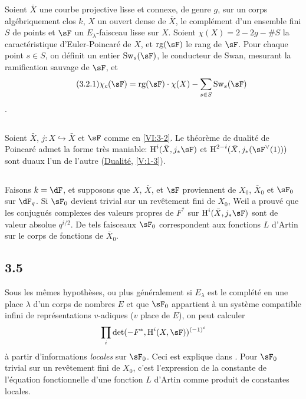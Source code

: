 Soient $\bar X$ une courbe projective lisse et connexe, de genre $g$, sur un 
corps algébriquement clos $k$, $X$ un ouvert dense de $\bar X$, 
le complément d'un ensemble fini $S$ de points et $\sF$ un 
$E_\lambda$-faisceau lisse sur $X$. Soient $\chi(X)=2-2 g-\# S$ la 
caractéristique d'Euler-Poincaré de $X$, et $\operatorname{rg}(\sF)$ le 
rang de $\sF$. Pour chaque point $s\in S$, on définit un entier 
$\swan_s(\sF)$, le conducteur de Swan, mesurant la ramification sauvage de 
$\sF$, et 
\begin{align*}\tag{3.2.1}\label{VI:eq:3-2-1}
  \chi_c(\sF) = \operatorname{rg}(\sF) \cdot \chi(X) - \sum_{s\in S} \swan_s(\sF) 
\end{align*}
\cite{ra65}. 





\subsection{}\label{VI:3-3}

Soient $\bar X$, $j:X\hookrightarrow\bar X$ et $\sF$ comme en \ref{VI:3-2}. Le 
théorème de dualité de Poincaré admet la forme très maniable: 
$\h^i(\bar X,j_\ast \sF)$ et $\h^{2-i}(\bar X,j_\ast(\sF^\vee(1)))$ sont 
duaux l'un de l'autre (\hyperlink{V}{Dualité}, \ref{V:1-3}). 





\subsection{}\label{VI:3-4}

Faisons $k=\dF$, et supposons que $X$, $\bar X$, et $\sF$ proviennent de 
$X_0$, $\bar X_0$ et $\sF_0$ sur $\dF_q$. Si $\sF_0$ devient trivial sur un 
revêtement fini de $X_0$, Weil a prouvé que les conjugués complexes des 
valeurs propres de $F^\ast$ sur $\h^i(\bar X,j_\ast\sF)$ sont de valeur 
absolue $q^{i/2}$. De tels faisceaux $\sF_0$ correspondent aux fonctions $L$ 
d'Artin sur le corps de fonctions de $\bar X_0$. 





\subsection*{3.5}\label{VI:3-5_} %

Sous les mêmes hypothèses, ou plus généralement si $E_\lambda$ est le 
complété en une place $\lambda$ d'un corps de nombres $E$ et que $\sF_0$ 
appartient à un système compatible infini de représentations $v$-adiques 
($v$ place de $E$), on peut calculer 
\[
  \prod_i \det(-F^\ast,\h^i(X,\sF))^{(-1)^i} 
\]
à partir d'informations \emph{locales} sur $\sF_0$. Ceci est explique dans 
\cite{de73}. Pour $\sF_0$ trivial sur un revêtement fini de $X_0$, c'est 
l'expression de la constante de l'équation fonctionnelle d'une fonction $L$ 
d'Artin comme produit de constantes locales. 





